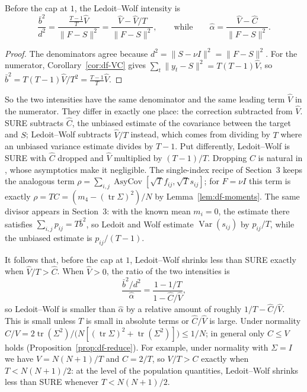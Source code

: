 \begin{proposition}\label{prop:df-lw}
Before the cap at $1$, the Ledoit--Wolf intensity is
\[
  \frac{\bar b^2}{d^2} = \frac{\frac{T-1}{T}\hat V}{\|F - S\|^2} = \frac{\hat V - \hat V/T}{\|F - S\|^2},
  \qquad\text{while}\qquad
  \hat\alpha = \frac{\hat V - \hat C}{\|F - S\|^2}.
\]
\end{proposition}

\begin{proof}
The denominators agree because $d^2 = \|S - \nu I\|^2 = \|F - S\|^2$. For the numerator, Corollary~\ref{cor:df-VC} gives $\sum_t \|y_t - S\|^2 = T(T-1)\hat V$, so $\bar b^2 = T(T-1)\hat V/T^2 = \frac{T-1}{T}\hat V$.
\end{proof}

So the two intensities have the same denominator and the same leading term $\hat V$ in the numerator. They differ in exactly one place: the correction subtracted from $\hat V$. SURE subtracts $\hat C$, the unbiased estimate of the covariance between the target and $S$; Ledoit--Wolf subtracts $\hat V/T$ instead, which comes from dividing by $T$ where an unbiased variance estimate divides by $T-1$. Put differently, Ledoit--Wolf is SURE with $\hat C$ dropped and $\hat V$ multiplied by $(T-1)/T$. Dropping $C$ is natural in \citet{ledoit2004}, whose asymptotics make it negligible. The single-index recipe of Section~3 keeps the analogous term $\rho = \sum_{i,j}\operatorname{AsyCov}[\sqrt{T}f_{ij}, \sqrt{T}s_{ij}]$; for $F = \nu I$ this term is exactly $\rho = TC = (m_4 - (\operatorname{tr}\Sigma)^2)/N$ by Lemma~\ref{lem:df-moments}. The same divisor appears in Section~3: with the known mean $m_i = 0$, the estimate there satisfies $\sum_{i,j}p_{ij} = T\bar b^2$, so Ledoit and Wolf estimate $\operatorname{Var}(s_{ij})$ by $p_{ij}/T$, while the unbiased estimate is $p_{ij}/(T-1)$.

It follows that, before the cap at $1$, Ledoit--Wolf shrinks less than SURE exactly when $\hat V/T > \hat C$. When $\hat V > 0$, the ratio of the two intensities is
\[
  \frac{\bar b^2/d^2}{\hat\alpha} = \frac{1 - 1/T}{1 - \hat C/\hat V},
\]
so Ledoit--Wolf is smaller than $\hat\alpha$ by a relative amount of roughly $1/T - \hat C/\hat V$. This is small unless $T$ is small in absolute terms or $\hat C/\hat V$ is large. Under normality $C/V = 2\operatorname{tr}(\Sigma^2)/\big(N[(\operatorname{tr}\Sigma)^2 + \operatorname{tr}(\Sigma^2)]\big) \le 1/N$; in general only $C \le V$ holds (Proposition~\ref{prop:df-reduce}). For example, under normality with $\Sigma = I$ we have $V = N(N+1)/T$ and $C = 2/T$, so $V/T > C$ exactly when $T < N(N+1)/2$: at the level of the population quantities, Ledoit--Wolf shrinks less than SURE whenever $T < N(N+1)/2$.

